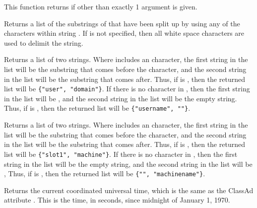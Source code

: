 \begin{description}
    This function returns  if other than exactly 1
    argument is given.

  \item[\Code{String list split(String s \Lbr\ , String tokens \Rbr\ )}]
    Returns a list of the substrings of  that have been split up
    by using any of the characters within string .
    If  is not specified, then all white space characters are
    used to delimit the string.

  \item[\Code{String list splitUserName(String Name)}]
    Returns a list of two strings.
    Where  includes an  character,
    the first string in the list will be the substring that comes before
    the  character, 
    and the second string in the list will be the substring that comes after.
    Thus, if  is , 
    then the returned list will be \verb|{"user", "domain"}|.
    If there is no  character in ,
    then the first string in the list will be , and the
    second string in the list will be the empty string.
    Thus, if  is , then the returned list
    will be \verb|{"username", ""}|.

  \item[\Code{String list splitSlotName(String Name)}]
    Returns a list of two strings.
    Where  includes an  character,
    the first string in the list will be the substring that comes before
    the  character, 
    and the second string in the list will be the substring that comes after.
    Thus, if  is , then the returned list
    will be \verb|{"slot1", "machine"}|.
    If there is no  character in ,
    then the first string in the list will be the empty string,
    and the second string in the list will be , 
    Thus, if  is , then the returned list
    will be \verb|{"", "machinename"}|.

  \item[\Code{Integer time()}]
    Returns the current coordinated universal time, which is the same
    as the ClassAd attribute .
    This is the time, in seconds, since midnight of January 1, 1970.

  \item[\Code{String formatTime(\Lbr\ Integer time \Rbr\ \Lbr\ , String format \Rbr)}]


\end{description}

